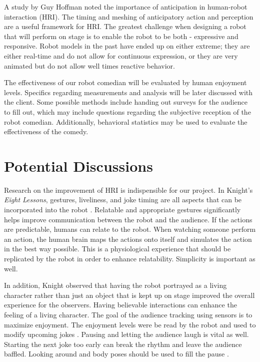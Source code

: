 \documentclass[onecolumn, draftclsnofoot,10pt, compsoc]{IEEEtran}
\begin{document}
A study by Guy Hoffman {\cite{hoffman2010anticipation}} noted the importance of anticipation in human-robot interaction (HRI). The timing and meshing of anticipatory action and perception are a useful framework for HRI. The greatest challenge when designing a robot that will perform on stage is to enable the robot to be both - expressive and responsive. Robot models in the past have ended up on either extreme; they are either real-time and do not allow for continuous expression, or they are very animated but do not allow well times reactive behavior.

The effectiveness of our robot comedian will be evaluated by human enjoyment levels. Specifics regarding measurements and analysis will be later discussed with the client. Some possible methods include handing out surveys for the audience to fill out, which may include questions regarding the subjective reception of the robot comedian. Additionally, behavioral statistics may be used to evaluate the effectiveness of the comedy.

\section{Potential Discussions}

Research on the improvement of HRI is indispensible for our project. In Knight's \textit{Eight Lessons}, gestures, liveliness, and joke timing are all aspects that can be incorporated into the robot {\cite{KnightEightLessons:2011}}.
Relatable and appropriate gestures significantly helps improve communication between the robot and the audience. If the actions are predictable, humans can relate to the robot.
When watching someone perform an action, the human brain maps the actions onto itself and simulates the action in the best way possible. This is a physiological experience that should be replicated by the robot in order to enhance relatability. Simplicity is important as well. {\cite{KnightEightLessons:2011}}


In addition, Knight observed that having the robot portrayed as a living character rather than just an object that is kept up on stage improved the overall experience for the observers. Having believable interactions can enhance the feeling of a living character.
The goal of the audience tracking using sensors is to maximize enjoyment. The enjoyment levels were be read by the robot and used to modify upcoming jokes {\cite{KnightEightLessons:2011}}. Pausing and letting the audience laugh is vital as well. Starting the next joke too early can break the rhythm and leave the audience baffled. Looking around and body poses should be used to fill the pause {\cite{KnightEightLessons:2011}}.
\end{document}
